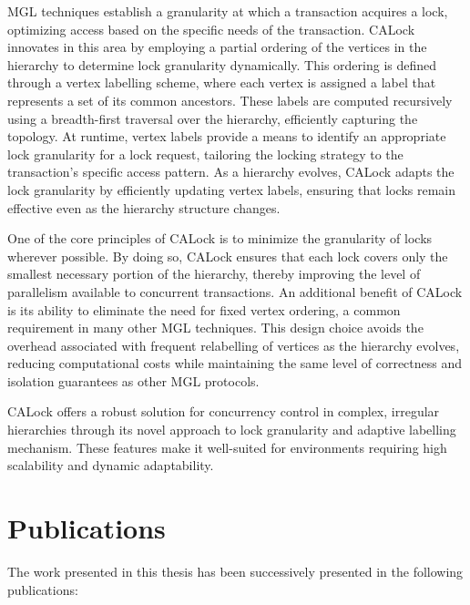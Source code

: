 MGL techniques establish a granularity at which a transaction acquires a lock, optimizing access based on the specific needs of the transaction. CALock innovates in this area by employing a partial ordering of the vertices in the hierarchy to determine lock granularity dynamically. This ordering is defined through a vertex labelling scheme, where each vertex is assigned a label that represents a set of its common ancestors. These labels are computed recursively using a breadth-first traversal over the hierarchy, efficiently capturing the topology. At runtime, vertex labels provide a means to identify an appropriate lock granularity for a lock request, tailoring the locking strategy to the transaction's specific access pattern. As a hierarchy evolves, CALock adapts the lock granularity by efficiently updating vertex labels, ensuring that locks remain effective even as the hierarchy structure changes.

One of the core principles of CALock is to minimize the granularity of locks wherever possible. By doing so, CALock ensures that each lock covers only the smallest necessary portion of the hierarchy, thereby improving the level of parallelism available to concurrent transactions. An additional benefit of CALock is its ability to eliminate the need for fixed vertex ordering, a common requirement in many other MGL techniques. This design choice avoids the overhead associated with frequent relabelling of vertices as the hierarchy evolves, reducing computational costs while maintaining the same level of correctness and isolation guarantees as other MGL protocols.

CALock offers a robust solution for concurrency control in complex, irregular hierarchies through its novel approach to lock granularity and adaptive labelling mechanism. These features make it well-suited for environments requiring high scalability and dynamic adaptability.

\newpage
\section*{Publications}

The work presented in this thesis has been successively presented in the following publications:



